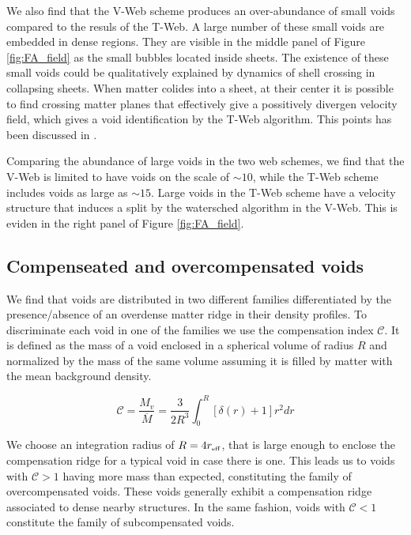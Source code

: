 \documentclass[a4,useAMS,usenatbib,usegraphicx]{mn2e}
\newcommand{\hMpc}{{\ifmmode{h^{-1}{\rm Mpc}}\else{$h^{-1}$Mpc}\fi}}
\newcommand{\eq}[2]{\begin{equation} \label{eq:#1} #2 \end{equation}}
\newcommand{\reff}{{\ifmmode{r_{\mbox{\tiny eff}}}\else{$r_{\mbox{\tiny eff}}$}\fi}}
\begin{document}
We also find that the V-Web scheme produces an over-abundance of small
voids compared to the resuls of the T-Web.
A large number of these small voids are embedded in dense regions. 
They are visible in the middle panel of Figure \ref{fig:FA_field} as
the small bubbles located inside sheets.
The existence of these small voids could be qualitatively explained by
dynamics of shell crossing in collapsing sheets. 
When matter colides into a sheet, at their center it is possible to
find crossing matter planes that effectively give a possitively
divergen velocity field, which gives a void identification by the
T-Web algorithm. This points has been discussed in \citet{Hoffman12}.

Comparing the abundance of large voids in the two web schemes, we find
that the V-Web is limited to have voids on the scale of $\sim 10$\hMpc,
while the T-Web scheme includes voids as large as $\sim 15$\hMpc. 
Large voids in the T-Web scheme have a velocity structure that
induces a split by the watersched algorithm in the V-Web. 
This is eviden in the right panel of Figure \ref{fig:FA_field}.

\subsection{Compenseated and overcompensated voids}
\label{subsec:enclosedmass}

We find that voids are distributed in two different  families differentiated by the
presence/absence of an overdense matter ridge in their density
profiles. 
To discriminate each void in one of the families we use the
compensation  index $\mathcal{C}$.
It is defined as the mass of a void enclosed in a spherical volume of
radius $R$ and normalized by the mass of the same volume assuming
it is filled by matter with the mean background density.

\eq{compensation}
{\mathcal{C} = \frac{M_v}{\overline{M}} = \frac{3}{2R^{3}} \int_0^{R} [\delta(r) + 1] r^2 dr}

We choose an integration radius of $R=4\reff$, that is large enough to 
enclose the compensation ridge for a typical void in case there is one. 
This leads us to voids with $\mathcal{C}>1$ having more mass than expected, 
constituting the family of overcompensated voids. These voids generally 
exhibit a compensation ridge associated to dense nearby structures. In the 
same fashion, voids with $\mathcal{C}<1$ constitute the family of 
subcompensated voids.
\end{document}
